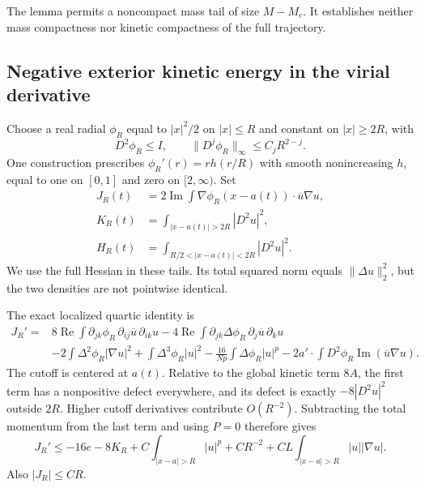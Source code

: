 The lemma permits a noncompact mass tail of size $M-M_c$. It establishes
neither mass compactness nor kinetic compactness of the full trajectory.

\subsection{Negative exterior kinetic energy in the virial derivative}
Choose a real radial $\phi_R$ equal to $|x|^2/2$ on $|x|\le R$ and
constant on $|x|\ge2R$, with
\[
 D^2\phi_R\le I,\qquad
 \|D^j\phi_R\|_\infty\le C_jR^{2-j}.
\]
One construction prescribes $\phi_R'(r)=rh(r/R)$ with smooth
nonincreasing $h$, equal to one on $[0,1]$ and zero on $[2,\infty)$.
Set
\begin{align*}
 J_R(t)&=2\operatorname{Im}\int
 \nabla\phi_R(x-a(t))\cdot\overline u\nabla u,\\
 K_R(t)&=\int_{|x-a(t)|>2R}|D^2u|^2,\\
 H_R(t)&=\int_{R/2<|x-a(t)|<2R}|D^2u|^2.
\end{align*}
We use the full Hessian in these tails. Its total squared norm equals
$\|\Delta u\|_2^2$, but the two densities are not pointwise identical.

The exact localized quartic identity is
\begin{align*}
 J_R'={}&8\operatorname{Re}\int\partial_{jk}\phi_R\,
           \partial_{ij}\overline u\,\partial_{ik}u
 -4\operatorname{Re}\int\partial_{jk}\Delta\phi_R\,
           \partial_j\overline u\,\partial_ku\\
 &-2\int\Delta^2\phi_R|\nabla u|^2
   +\int\Delta^3\phi_R|u|^2
   -\frac{16}{Np}\int\Delta\phi_R|u|^p
   -2a'\cdot\int D^2\phi_R\operatorname{Im}(\overline u\nabla u).
\end{align*}
The cutoff is centered at $a(t)$. Relative to the global kinetic term
$8A$, the first term has a nonpositive defect everywhere, and its defect
is exactly $-8|D^2u|^2$ outside $2R$. Higher cutoff derivatives contribute
$O(R^{-2})$. Subtracting the total momentum from the last term and using
$P=0$ therefore gives
\begin{equation}\label{eq:r12-retained-virial}
 J_R'\le-16e-8K_R+C\int_{|x-a|>R}|u|^p
          +CR^{-2}+CL\int_{|x-a|>R}|u||\nabla u|.
\end{equation}
Also $|J_R|\le CR$.


